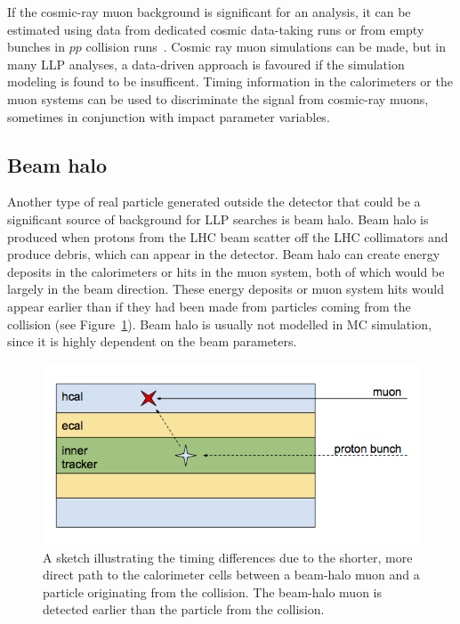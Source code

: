 If the cosmic-ray muon background is significant for an analysis, it can be estimated using data from dedicated cosmic data-taking runs or from empty bunches in $pp$ collision runs~\cite{Khachatryan:2015jha, Chatrchyan:2012dxa, Khachatryan:2010uf}. Cosmic ray muon simulations can be made, but in many LLP analyses, a data-driven approach is favoured if the simulation modeling is found to be insufficent. Timing information in the calorimeters or the muon systems can be used to discriminate the signal from cosmic-ray muons, sometimes in conjunction with impact parameter variables.

\subsection{Beam halo} %

Another type of real particle generated outside the detector that could be a significant source of background for LLP searches is beam halo. Beam halo is produced when protons from the LHC beam scatter off the LHC collimators and produce debris, which can appear in the detector. Beam halo can create energy deposits in the calorimeters or hits in the muon system, both of which would be largely in the beam direction. These energy deposits or muon system hits would appear earlier than if they had been made from particles coming from the collision (see Figure~\ref{fig:beamHaloSketch}). Beam halo is usually not modelled in MC simulation, since it is highly dependent on the beam parameters.

\begin{figure}[t]
  \centering
  \includegraphics[width=\textwidth]{figures/beamHaloSketch.png}
  \caption{A sketch illustrating the timing differences due to the shorter, more direct path to the calorimeter cells between a beam-halo muon and a particle originating from the collision. The beam-halo muon is detected earlier than the particle from the collision.}
  \label{fig:beamHaloSketch}
\end{figure}

